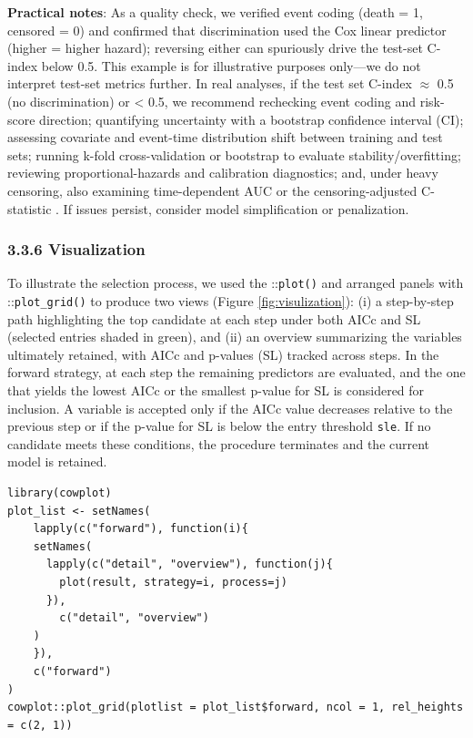 \textbf{Practical notes}: As a quality check, we verified event coding (death = 1, censored = 0) and confirmed that discrimination used the Cox linear predictor (higher = higher hazard); reversing either can spuriously drive the test-set C-index below 0.5. This example is for illustrative purposes only---we do not interpret test-set metrics further. In real analyses, if the test set C-index \(\approx\) 0.5 (no discrimination) or \textless{} 0.5, we recommend rechecking event coding and risk-score direction; quantifying uncertainty with a bootstrap confidence interval (CI); assessing covariate and event-time distribution shift between training and test sets; running k-fold cross-validation or bootstrap to evaluate stability/overfitting; reviewing proportional-hazards and calibration diagnostics; and, under heavy censoring, also examining time-dependent AUC or the censoring-adjusted C-statistic \citep{Uno2011}. If issues persist, consider model simplification or penalization.

\subsubsection{3.3.6 Visualization}\label{visualization}

To illustrate the selection process, we used the ::\texttt{plot()} and arranged panels with ::\texttt{plot\_grid()} to produce two views (Figure \ref{fig:visulization}): (i) a step-by-step path highlighting the top candidate at each step under both AICc and SL (selected entries shaded in green), and (ii) an overview summarizing the variables ultimately retained, with AICc and p-values (SL) tracked across steps. In the forward strategy, at each step the remaining predictors are evaluated, and the one that yields the lowest AICc or the smallest p-value for SL is considered for inclusion. A variable is accepted only if the AICc value decreases relative to the previous step or if the p-value for SL is below the entry threshold \texttt{sle}. If no candidate meets these conditions, the procedure terminates and the current model is retained.

\begin{verbatim}
library(cowplot)
plot_list <- setNames(
    lapply(c("forward"), function(i){
    setNames(
      lapply(c("detail", "overview"), function(j){
        plot(result, strategy=i, process=j)
      }),
        c("detail", "overview")
    )
    }),
    c("forward")
)
cowplot::plot_grid(plotlist = plot_list$forward, ncol = 1, rel_heights = c(2, 1))
\end{verbatim}

